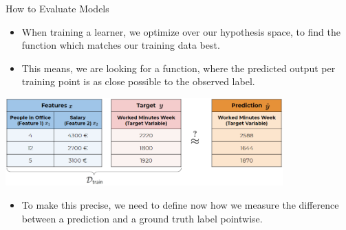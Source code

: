 \documentclass[11pt,compress,t,notes=noshow, xcolor=table]{beamer}
\begin{document}
\begin{vbframe}{How to Evaluate Models}

\begin{itemize}
\item When training a learner, we optimize over our hypothesis space,
    to find the function which matches our training data best.
\item This means, we are looking for a function, where the 
    predicted output per training point is as close possible to
    the observed label.
\end{itemize}





\begin{center}\includegraphics[width=0.8\textwidth]{figure_man/ml-basics-riskmin-eval.png} \end{center}
\begin{itemize}
    \item To make this precise, we need to define now how we measure the difference
        between a prediction and a ground truth label pointwise.
  \end{itemize}
  
\end{vbframe}
\end{document}
